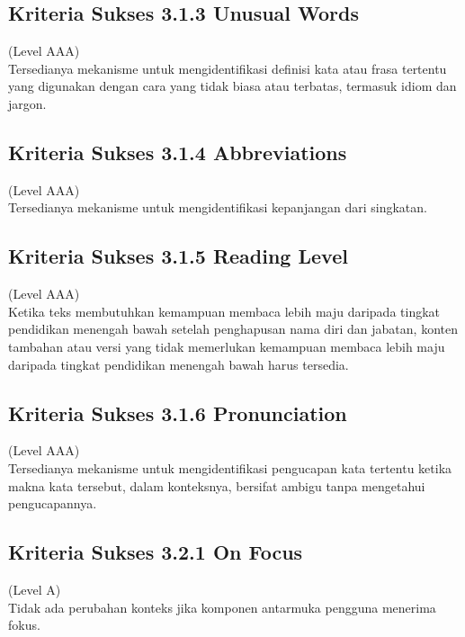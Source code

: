 \subsection{Kriteria Sukses 3.1.3 Unusual Words}
\label{subsec:kriteria_3.1.3}
(Level AAA) \\

Tersedianya mekanisme untuk mengidentifikasi definisi kata atau frasa tertentu yang digunakan dengan cara yang tidak biasa atau terbatas, termasuk idiom dan jargon.

\subsection{Kriteria Sukses 3.1.4 Abbreviations}
\label{subsec:kriteria_3.1.4}
(Level AAA) \\

Tersedianya mekanisme untuk mengidentifikasi kepanjangan dari singkatan.

\subsection{Kriteria Sukses 3.1.5 Reading Level}
\label{subsec:kriteria_3.1.5}
(Level AAA) \\

Ketika teks membutuhkan kemampuan membaca lebih maju daripada tingkat pendidikan menengah bawah setelah penghapusan nama diri dan jabatan, konten tambahan atau versi yang tidak memerlukan kemampuan membaca lebih maju daripada tingkat pendidikan menengah bawah harus tersedia.

\subsection{Kriteria Sukses 3.1.6 Pronunciation}
\label{subsec:kriteria_3.1.6}
(Level AAA) \\

Tersedianya mekanisme untuk mengidentifikasi pengucapan kata tertentu ketika makna kata tersebut, dalam konteksnya, bersifat ambigu tanpa mengetahui pengucapannya.

\subsection{Kriteria Sukses 3.2.1 On Focus}
\label{subsec:kriteria_3.2.1}
(Level A) \\

Tidak ada perubahan konteks jika komponen antarmuka pengguna menerima fokus.


